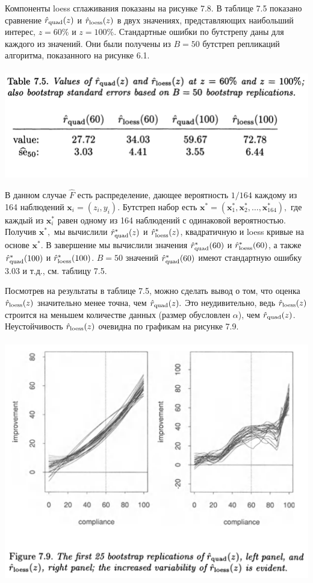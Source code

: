 Компоненты loess сглаживания показаны на рисунке 7.8. В таблице 7.5 показано сравнение $\hat{r}_{\text{quad}}(z)$ и $\hat{r}_{\text{loess}}(z)$ в двух значениях, представляющих наибольший интерес, $z = 60\%$ и $z = 100\%$. Стандартные ошибки по бутстрепу даны для каждого из значений. Они были получены из $B = 50$ бутстреп репликаций алгоритма, показанного на рисунке 6.1.
\\~\\
\noindent
\includegraphics[width=0.9\linewidth]{6/t75.png}
\newline
\setcounter{table}{5}

В данном случае $\hat F$ есть распределение, дающее вероятность $1/164$ каждому из 164 наблюдений $\mathbf x_i = (z_i, y_i).$ Бутстреп набор есть $\mathbf x^* = (\mathbf x_1^*,\mathbf x_2^*, \ldots, \mathbf x_{164}^*),$ где каждый из $\mathbf x_i^* $ равен одному из 164 наблюдений с одинаковой вероятностью. Получив $\mathbf x^*,$ мы вычислили $\hat{r}_{\text{quad}}^*(z)$ и $\hat{r}_{\text{loess}}^*(z)$, квадратичную и loess кривые на основе $\mathbf x^*.$ В завершение мы вычислили значения $\hat{r}_{\text{quad}}^*(60)$ и $\hat{r}_{\text{loess}}^*(60)$, а также $\hat{r}_{\text{quad}}^*(100)$ и $\hat{r}_{\text{loess}}^*(100)$. $B = 50$ значений $\hat{r}_{\text{quad}}^*(60)$ имеют стандартную ошибку $3.03$ и т.д., см. таблицу 7.5.

Посмотрев на результаты в таблице 7.5, можно сделать вывод о том, что оценка $\hat{r}_{\text{loess}}(z)$ значительно менее точна, чем $\hat{r}_{\text{quad}}(z).$	Это неудивительно, ведь $\hat{r}_{\text{loess}}(z)$ строится на меньшем количестве данных (размер обусловлен $\alpha$), чем $\hat{r}_{\text{quad}}(z)$. Неустойчивость $\hat{r}_{\text{loess}}(z)$ очевидна по графикам на рисунке 7.9.
\\~\\
\noindent
\includegraphics[width=0.9\linewidth]{6/f79.png}
\newline
\setcounter{figure}{9}

